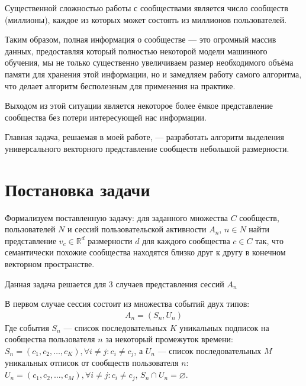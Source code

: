 \documentclass[times,specification,annotation]{itmo-student-thesis}
\begin{document}
Существенной сложностью работы с сообществами является число сообществ (миллионы), каждое из которых может состоять из миллионов пользователей.  

Таким образом, полная информация о сообществе --- это огромный массив
данных, предоставляя который полностью некоторой модели машинного обучения,
мы не только существенно увеличиваем размер необходимого объёма памяти для хранения этой информации, но и замедляем работу самого алгоритма, что делает алгоритм бесполезным для применения на практике.

Выходом из этой ситуации является некоторое более ёмкое представление сообщества без потери интересующей нас информации.

Главная задача, решаемая в моей работе, --- разработать алгоритм выделения универсального векторного представление сообществ небольшой размерности. 




\section{Постановка задачи}\label{sec:intro}

Формализуем поставленную задачу: для заданного множества $C$ сообществ, пользователей $N$ и сессий пользовательской активности $A_n$, $n \in N$ найти представление $v_{c} \in \mathbb{R}^d$ размерности $d$ для каждого сообщества $c \in C$ так, что семантически похожие сообщества находятся близко друг к другу в конечном векторном пространстве. 

Данная задача решается для 3 случаев представления сессий $A_n$
 
В первом случае сессия состоит из множества событий двух типов:
 \begin{align}
A_n = (S_n, U_n) 
\label{eq-subs}
\end{align}
Где события $S_n$ --- список последовательных $K$ уникальных подписок на сообщества пользователя $n$ за некоторый промежуток времени: $S_n = (c_{1}, c_{2}, \dots, c_{K}), \forall i \ne j : c_i \ne c_j$, а $U_n$ --- список последовательных $M$ уникальных отписок от сообществ пользователя $n$: $U_n = (c_{1},  c_{2}, \dots, c_{M}), \forall i \ne j : c_i \ne c_j$, $S_n \cap U_n = \varnothing$.
\end{document}
